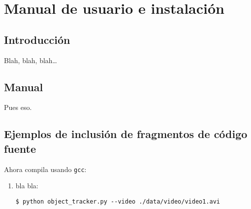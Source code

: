 
\chapter{Manual de usuario e instalación}
\label{cha:manual-usuario}

\section{Introducción}
\label{sec:intro-manual-de-usuario}

Blah, blah, blah\ldots


\section{Manual}
\label{sec:sec-manual-de-usuario}

Pues eso.


\section{Ejemplos de inclusión de fragmentos de código fuente}
\label{sec:codigo-fuente}

Ahora compila usando \texttt{gcc}:

\begin{enumerate}
\item bla bla:

\begin{lstlisting}
$ python object_tracker.py --video ./data/video/video1.avi

\end{lstlisting}

\end{enumerate}


